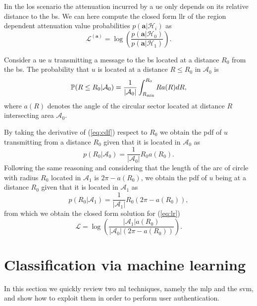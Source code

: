 \documentclass[twocolumns]{IEEEtran}
\begin{document}
Iin the \ac{los} scenario the attenuation incurred by a \ac{ue} only depends on its relative distance to the \ac{bs}. We can here compute the closed form \ac{llr} of the region dependent attenuation value probabilities $p(\bm{a}|\mathcal{H}_i)$ as
\begin{equation}\label{eq:lr}
    \mathcal{L}^{(\bm{a})}=\log\left(\frac{p(\bm{a}|\mathcal{H}_0)}{p(\bm{a}|\mathcal{H}_1)}\right).
\end{equation}

Consider a \ac{ue} $u$ transmitting a message to the \ac{bs} located at a distance $R_0$ from the \ac{bs}. The probability that $u$ is located at a distance $R\le R_0$ in $\mathcal{A}_0$ is
\begin{equation}\label{eq:cdf}
     \mathbb{P}(R \le R_0|\mathcal{A}_0) = \frac{1}{|\mathcal{A}_0|}\int_{R_{\rm min}}^{R_0} R a(R) dR,
\end{equation}
where $a(R)$ denotes the angle of the circular sector located at distance $R$ intersecting area $\mathcal{A}_0$.

By taking the derivative of (\ref{eq:cdf}) respect to $R_0$ we obtain the \ac{pdf} of $u$ transmitting from a distance $R_0$ given that it is located in $\mathcal{A}_0$ as
\begin{equation}
    p(R_0|\mathcal{A}_0) = \frac{1}{|\mathcal{A}_0|}R_0a(R_0).
\end{equation}
Following the same reasoning and considering that the length of the arc of circle with radius $R_0$ located in $\mathcal{A}_1$ is $2\pi - a(R_0)$, we obtain the \ac{pdf} of $u$ being at a distance $R_0$ given that it is located in $\mathcal{A}_1$ as
\begin{equation}
     p(R_0|\mathcal{A}_1) = \frac{1}{|\mathcal{A}_1|}R_0\left(2\pi-a(R_0)\right),
\end{equation}
from which we obtain the closed form solution for (\ref{eq:lr}) 
\begin{equation}
    \mathcal{L}=\log\left(\frac{|\mathcal{A}_1|a(R_0)}{|\mathcal{A}_0|\left(2\pi-a(R_0)\right)}\right).
\end{equation}

\section{Classification via machine learning}
In this section we quickly review two \ac{ml} techniques, namely the \ac{mlp} and the \ac{svm}, and show how to exploit them in order to perform user authentication.
\end{document}
